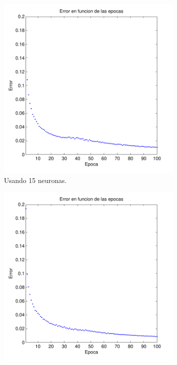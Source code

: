 \documentclass[informe.tex]{subfiles}
\begin{document}
    \begin{figure}
        \centering
        \begin{subfigure}[b]{0.32\textwidth}
                \includegraphics[width=\textwidth]{graficos/error_fold1_15_binary_100_03.pdf}
                \caption{Usando 15 neuronas.}
                \label{fig:d1-f1-03-n15}
        \end{subfigure}
        \begin{subfigure}[b]{0.32\textwidth}
                \includegraphics[width=\textwidth]{graficos/error_fold1_20_binary_100_03.pdf}

\end{subfigure}
\end{figure}
\end{document}
